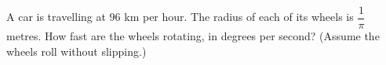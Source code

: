 A car is travelling at $96$ km per hour. The radius of each of its wheels is $\dfrac{1}{\pi}$ metres. How fast are the wheels rotating, in degrees per second? (Assume the wheels roll without slipping.)
